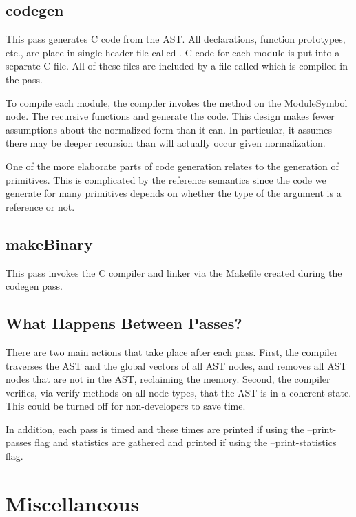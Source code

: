\documentclass[10pt]{article}
\begin{document}
\subsection{codegen}

This pass generates C code from the AST.  All declarations, function
prototypes, etc., are place in single header file called
.  C code for each module is put into a separate C
file.  All of these files are included by a file called 
which is compiled in the  pass.

To compile each module, the compiler invokes the 
method on the ModuleSymbol node.  The recursive functions
 and  generate the code.  This design makes
fewer assumptions about the normalized form than it can.  In
particular, it assumes there may be deeper recursion than will
actually occur given normalization.

One of the more elaborate parts of code generation relates to the
generation of primitives.  This is complicated by the reference
semantics since the code we generate for many primitives depends on
whether the type of the argument is a reference or not.

\subsection{makeBinary}

This pass invokes the C compiler and linker via the Makefile created
during the codegen pass.

\subsection{What Happens Between Passes?}
\label{sec:betweenpasses}

There are two main actions that take place after each pass.  First,
the compiler traverses the AST and the global vectors of all AST
nodes, and removes all AST nodes that are not in the AST, reclaiming
the memory.  Second, the compiler verifies, via verify methods on all
node types, that the AST is in a coherent state.  This could be turned
off for non-developers to save time.

In addition, each pass is timed and these times are printed if using
the --print-passes flag and statistics are gathered and printed if
using the --print-statistics flag.

\section{Miscellaneous}
\label{sec:misc}
\end{document}
